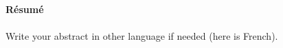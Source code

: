 \thispagestyle{empty}
{\noindent\large\textbf{Résumé}}
\\ \\
{\linespread{1.}\small
\noindent Write your abstract in other language if needed (here is French). 
\vfill
\noindent
}